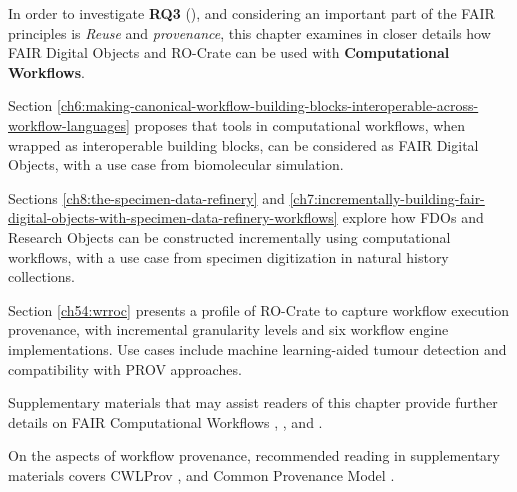 In order to investigate \textbf{RQ3} (), and considering an important part of the FAIR principles is \emph{Reuse} and \emph{provenance}, this chapter examines in closer details how FAIR Digital Objects and RO-Crate can be used with \textbf{Computational Workflows}. 

Section \vref{ch6:making-canonical-workflow-building-blocks-interoperable-across-workflow-languages} proposes that tools in computational workflows, when wrapped as interoperable building blocks, can be considered as FAIR Digital Objects, with a use case from biomolecular simulation.

Sections \vref{ch8:the-specimen-data-refinery} and \vref{ch7:incrementally-building-fair-digital-objects-with-specimen-data-refinery-workflows} explore how FDOs and Research Objects can be constructed incrementally using computational workflows, with a use case from specimen digitization in natural history collections.

Section \vref{ch54:wrroc} presents a profile of RO-Crate to capture workflow execution provenance, with incremental granularity levels and six workflow engine implementations. Use cases include machine learning-aided tumour detection and compatibility with PROV approaches. 

Supplementary materials that may assist readers of this chapter provide further details on FAIR Computational Workflows \cite{Goble 2020},  \cite{Goble 2021},  \cite{Crusoe 2022} and  \cite{Brack 2022a}. 

On the aspects of workflow provenance, recommended reading in supplementary materials covers CWLProv \cite{Khan 2019},  \cite{De Geest 2022} and Common Provenance Model \cite{Wittner 2020,Wittner 2023a}.
